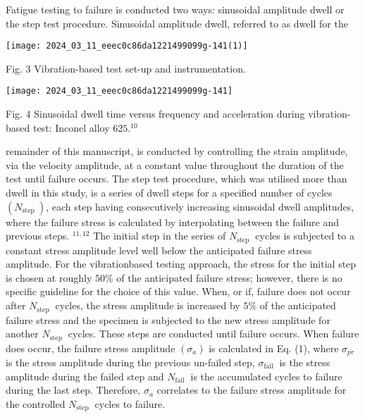 \documentclass[10pt]{article}
\begin{document}
Fatigue testing to failure is conducted two ways: sinusoidal amplitude dwell or the step test procedure. Sinusoidal amplitude dwell, referred to as dwell for the

\begin{center}
\texttt{[image: 2024\_03\_11\_eeec0c86da1221499099g-141(1)]}
\end{center}

Fig. 3 Vibration-based test set-up and instrumentation.

\begin{center}
\texttt{[image: 2024\_03\_11\_eeec0c86da1221499099g-141]}
\end{center}

Fig. 4 Sinusoidal dwell time versus frequency and acceleration during vibration-based test: Inconel alloy $625 .^{10}$

remainder of this manuscript, is conducted by controlling the strain amplitude, via the velocity amplitude, at a constant value throughout the duration of the test until failure occurs. The step test procedure, which was utilised more than dwell in this study, is a series of dwell steps for a specified number of cycles $\left(N_{\text {step }}\right)$, each step having consecutively increasing sinusoidal dwell amplitudes, where the failure stress is calculated by interpolating between the failure and previous steps. ${ }^{11,12}$ The initial step in the series of $N_{\text {step }}$ cycles is subjected to a constant stress amplitude level well below the anticipated failure stress amplitude. For the vibrationbased testing approach, the stress for the initial step is chosen at roughly $50 \%$ of the anticipated failure stress; however, there is no specific guideline for the choice of this value. When, or if, failure does not occur after $N_{\text {step }}$ cycles, the stress amplitude is increased by $5 \%$ of the anticipated failure stress and the specimen is subjected to the new stress amplitude for another $N_{\text {step }}$ cycles. These steps are conducted until failure occurs. When failure does occur, the failure stress amplitude $\left(\sigma_{a}\right)$ is calculated in Eq. (1), where $\sigma_{p r}$ is the stress amplitude during the previous un-failed step, $\sigma_{\text {fail }}$ is the stress amplitude during the failed step and $N_{\text {fail }}$ is the accumulated cycles to failure during the last step. Therefore, $\sigma_{a}$ correlates to the failure stress amplitude for the controlled $N_{\text {step }}$ cycles to failure.
\end{document}
